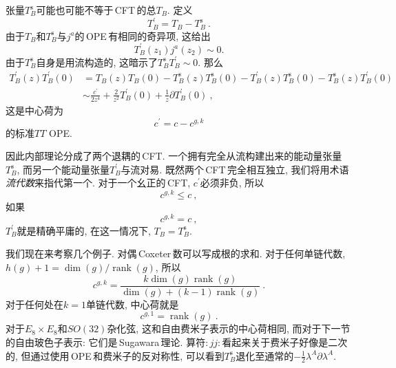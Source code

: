 张量$ T_{B}^{\mathrm{s}} $可能也可能不等于\,CFT\,的总$ T_{B}$. 定义
\begin{equation}
    T_{B}^{\prime} = T_{B} - T_{B}^{\mathrm{s}} \:. \label{11.5.28}
\end{equation}
由于$ T_{B} $和$ T_{B}^{\mathrm{s}} $与$ j^{a} $的\,OPE\,有相同的奇异项, 这给出
\begin{equation}
    T_{B}^{\prime}(z_{1})j^{a}(z_{2})\sim 0 . \label{11.5.29}
\end{equation}
由于$ T_{B}^{\mathrm{s}} $自身是用流构造的, 这暗示了$ T_{B}^{\mathrm{s}}T_{B}^{\prime}\sim 0$. 那么
\begin{align}
    T_{B}^{\prime}(z)T_{B}^{\prime}(0) &= T_{B}(z)T_{B}(0)-T_{B}^{\mathrm{s}}(z)T_{B}^{\mathrm{s}}(0)
    -T_{B}^{\prime}(z)T_{B}^{\mathrm{s}}(0) - T_{B}^{\mathrm{s}}(z)T_{B}^{\prime}(0) \nonumber \\
    &\sim \frac{c^{\prime}}{2z^{4}}+\frac{2}{z^{2}}T_{B}^{\prime}(0) +\frac{1}{z}\partial T_{B}^{\prime}(0)\:,
    \label{11.5.30}
\end{align}
这是中心荷为
\begin{equation}
    c^{\prime}=c-c^{g,k} \label{11.5.31}
\end{equation}
的标准$ TT $ OPE. 

因此内部理论分成了两个退耦的\,CFT. 一个拥有完全从流构建出来的能动量张量$ T_{B}^{\mathrm{s}}$, 而另一个能动量张量$ T_{B}^{\prime} $与流对易. 既然两个\,CFT\,完全相互独立, 我们将用术语{\emph{流代数}}来指代第一个. 对于一个幺正的\,CFT, $c^{\prime} $必须非负, 所以
\begin{equation}
    c^{g,k}\leq c \:, \label{11.5.32}
\end{equation}
如果
\begin{equation}
    c^{g,k}=c \:, \label{11.5.33}
\end{equation}
$T_{B}^{\prime} $就是精确平庸的, 在这一情况下, $T_{B}=T_{B}^{\mathrm{s}}$.

我们现在来考察几个例子. 对偶\,Coxeter\,数可以写成根的求和. 对于任何单链代数, $h(g)+1=\operatorname{dim}(g)/\operatorname{rank}(g)$, 所以
\begin{equation}
    c^{g,k} = \frac{k\operatorname{dim}(g)\operatorname{rank}(g)}{\operatorname{dim}(g)+(k-1)\operatorname{rank}(g)}
    \:. \label{11.5.34}
\end{equation}
对于任何处在$ k=1 $单链代数, 中心荷就是
\begin{equation}
    c^{g,1}=\operatorname{rank}(g) \:. \label{11.5.35}
\end{equation}
对于$ E_{8}\times E_{8} $和$ SO(32) $杂化弦, 这和自由费米子表示的中心荷相同, 而对于下一节的自由玻色子表示: 它们是\,Sugawara\,理论. 算符$ :jj: $看起来关于费米子好像是二次的, 但通过使用\,OPE\,和费米子的反对称性, 可以看到$ T_{B}^{\mathrm{s}} $退化至通常的$ -\tfrac{1}{2}\lambda^{A}\partial\lambda^{A}$.

